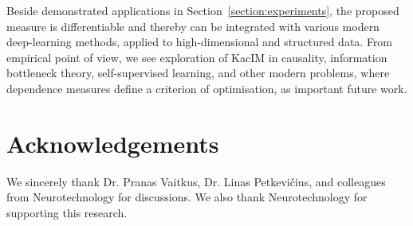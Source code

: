 \documentclass{article}
\begin{document}
Beside demonstrated applications in Section~\ref{section:experiments}, the proposed measure is differentiable and thereby can be integrated with various modern deep-learning methods, applied to high-dimensional and structured data. From empirical point of view, we see exploration of KacIM in causality, information bottleneck theory, self-supervised learning, and other modern problems, where dependence measures define a criterion of optimisation, as important future work. %

\section{Acknowledgements}

We sincerely thank Dr. Pranas Vaitkus, Dr. Linas Petkevi\v{c}ius, and colleagues from Neurotechnology for discussions. We also thank Neurotechnology for supporting this research.
\end{document}

